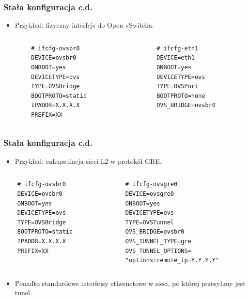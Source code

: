 \documentclass[dvipsnames,table]{beamer}
\begin{document}
\begin{frame}[fragile]
\frametitle{Stała konfiguracja c.d.}
\begin{itemize}
	\item Przykład: fizyczny interfejs do Open vSwitcha.
\end{itemize}
\begin{columns}
	\begin{column}{0.5\textwidth}
		\begin{verbatim}
		# ifcfg-ovsbr0
		DEVICE=ovsbr0
		ONBOOT=yes
		DEVICETYPE=ovs
		TYPE=OVSBridge
		BOOTPROTO=static
		IPADDR=X.X.X.X
		PREFIX=XX
		\end{verbatim}
	\end{column}
	\begin{column}{0.5\textwidth}
		\begin{verbatim}
		# ifcfg-eth1
		DEVICE=eth1
		ONBOOT=yes
		DEVICETYPE=ovs
		TYPE=OVSPort
		BOOTPROTO=none
		OVS_BRIDGE=ovsbr0
		\end{verbatim}
	\end{column}
\end{columns}
\end{frame}

\begin{frame}[fragile]
\frametitle{Stała konfiguracja c.d.}
\begin{itemize}
	\item Przykład: enkapsulacja sieci L2 w protokół GRE.
\end{itemize}
\begin{columns}
	\begin{column}{0.5\textwidth}
		\begin{verbatim}
	# ifcfg-ovsbr0
	DEVICE=ovsbr0
	ONBOOT=yes
	DEVICETYPE=ovs
	TYPE=OVSBridge
	BOOTPROTO=static
	IPADDR=X.X.X.X
	PREFIX=XX
		\end{verbatim}
	\end{column}
	\begin{column}{0.5\textwidth}
		\begin{verbatim}
	# ifcfg-ovsgre0
	DEVICE=ovsgre0
	ONBOOT=yes
	DEVICETYPE=ovs
	TYPE=OVSTunnel
	OVS_BRIDGE=ovsbr0
	OVS_TUNNEL_TYPE=gre
	OVS_TUNNEL_OPTIONS=
	"options:remote_ip=Y.Y.Y.Y"
		\end{verbatim}
	\end{column}
\end{columns}
\begin{itemize}
	\item Ponadto standardowe interfejsy ethernetowe w sieci, po której przesyłany jest tunel.
\end{itemize}
\end{frame}
\end{document}
